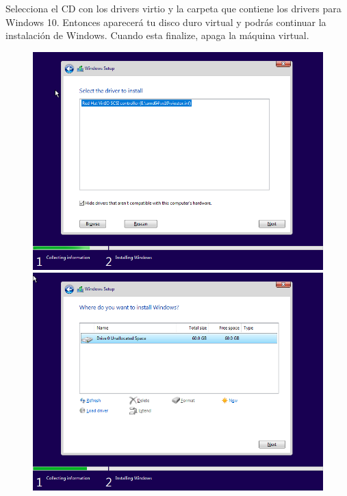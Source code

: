 \documentclass[11pt]{article}
\begin{document}
\vspace{5pt}

Selecciona el CD con los drivers virtio y la carpeta que contiene los drivers para Windows 10. Entonces aparecerá tu disco duro virtual y podrás continuar la instalación de Windows. Cuando esta finalize, apaga la máquina virtual.

\begin{figure}[h!]
	\centering
	\begin{minipage}[b]{0.4965\textwidth}
		\includegraphics[width=\textwidth]{images/windows-setup-03.png}
	\end{minipage}
	\begin{minipage}[b]{0.4965\textwidth}
		\includegraphics[width=\textwidth]{images/windows-setup-04.png}
	\end{minipage}
\end{figure}
\end{document}
